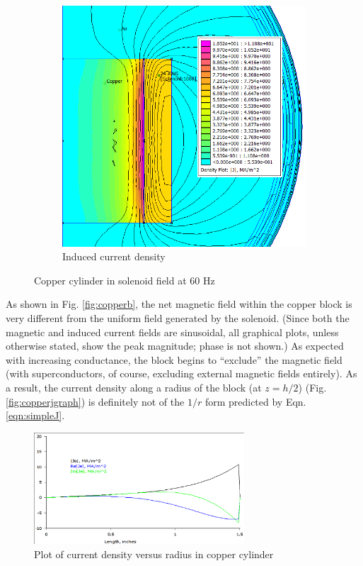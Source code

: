 \documentclass[]{article}
\begin{document}
\begin{figure}[h]
\begin{subfigure}{0.45\textwidth}
		\includegraphics[width=1\textwidth]{CopperJ}
		\caption{Induced current density}
		\label{fig:copperj}
	\end{subfigure}
	\caption{Copper cylinder in solenoid field at 60 Hz}
\end{figure}
As shown in Fig. \ref{fig:copperb}, the net magnetic field within the copper block is very different from the uniform field generated by the solenoid. (Since both the magnetic and induced current fields are sinusoidal, all graphical plots, unless otherwise stated, show the peak magnitude; phase is not shown.) As expected with increasing conductance, the block begins to ``exclude'' the magnetic field (with superconductors, of course, excluding external magnetic fields entirely). As a result, the current density along a radius of the block (at $z=h/2$) (Fig. \ref{fig:copperjgraph}) is definitely not of the $1/r$ form predicted by Eqn. \ref{eqn:simpleJ}.
\begin{figure}[h]
	\centering
	\includegraphics[width=0.7\textwidth]{CopperJgraph}
	\caption{Plot of current density versus radius in copper cylinder}
\end{figure}
\end{document}
